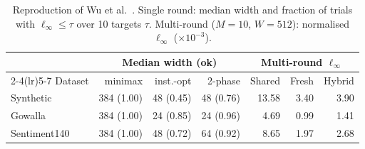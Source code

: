 \begin{table}[t]\centering\footnotesize
\caption{Reproduction of Wu et al.~\cite{wu2023}. Single round: median width and fraction of trials with $\ell_\infty\le\tau$ over 10 targets $\tau$. Multi-round ($M{=}10$, $W{=}512$): normalised $\ell_\infty$ ($\times10^{-3}$).}\label{tab:repro}
\setlength{\tabcolsep}{3pt}\begin{tabular}{lrrrrrr}\toprule
 & \multicolumn{3}{c}{Median width (ok)} & \multicolumn{3}{c}{Multi-round $\ell_\infty$}\\\cmidrule(lr){2-4}\cmidrule(lr){5-7}
Dataset & minimax & inst.-opt & 2-phase & Shared & Fresh & Hybrid\\\midrule
Synthetic & 384 (1.00) & 48 (0.45) & 48 (0.76) & 13.58 & 3.40 & 3.90\\
Gowalla & 384 (1.00) & 24 (0.85) & 24 (0.96) & 4.69 & 0.99 & 1.41\\
Sentiment140 & 384 (1.00) & 48 (0.72) & 64 (0.92) & 8.65 & 1.97 & 2.68\\
\bottomrule\end{tabular}\end{table}